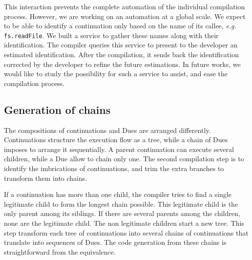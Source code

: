 This interaction prevents the complete automation of the individual compilation process.
However, we are working on an automation at a global scale.
We expect to be able to identify a continuation only based on the name of its callee, \textit{e.g.} \texttt{fs.readFile}.
We built a service to gather these names along with their identification.
The compiler queries this service to present to the developer an estimated identification.
After the compilation, it sends back the identification corrected by the developer to refine the future estimations.
In future works, we would like to study the possibility for such a service to assist, and ease the compilation process.

\subsection{Generation of chains}

The compositions of continuations and Dues are arranged differently.
Continuations structure the execution flow as a tree, while a chain of Dues imposes to arrange it sequentially.
A parent continuation can execute several children, while a Due allow to chain only one.
The second compilation step is to identify the imbrications of continuations, and trim the extra branches to transform them into chains.

If a continuation has more than one child, the compiler tries to find a single legitimate child to form the longest chain possible.
This legitimate child is the only parent among its siblings.
If there are several parents among the children, none are the legitimate child.
The non legitimate children start a new tree.
This step transform each tree of continuations into several chains of continuations that translate into sequences of Dues.
The code generation from these chains is straightforward from the equivalence.







